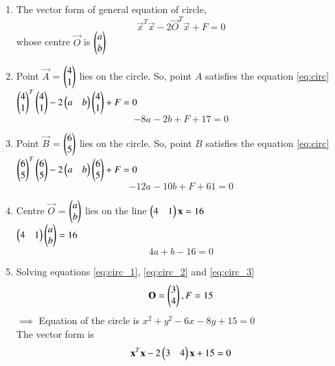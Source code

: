 \renewcommand{\theequation}{\theenumi}
\begin{enumerate}[label=\arabic*.,ref=\thesubsection.\theenumi]
\item The vector form of general equation of circle, 
\begin{equation} \label{eq:circ}
\vec{x}^T\vec{x}-2\vec{O}^T\vec{x}+F=0
\end{equation}
whose centre $\vec{O}$ is $\begin{pmatrix}a\\b\end{pmatrix}$

\item Point $\vec{A}$ = $\begin{pmatrix}4\\1\end{pmatrix}$ lies on the circle. So, point $A$ satisfies the equation \ref{eq:circ} \\
$\begin{pmatrix}4\\1\end{pmatrix}^T\begin{pmatrix}4\\1\end{pmatrix}-2\begin{pmatrix}a&b\end{pmatrix}\begin{pmatrix}4\\1\end{pmatrix}+F=0$ \\
\begin{equation} \label{eq:circ_1}
-8a-2b+F+17=0
\end{equation}

\item Point $\vec{B}$ = $\begin{pmatrix}6\\5\end{pmatrix}$ lies on the circle. So, point $B$ satisfies the equation \ref{eq:circ} \\
$\begin{pmatrix}6\\5\end{pmatrix}^T\begin{pmatrix}6\\5\end{pmatrix}-2\begin{pmatrix}a&b\end{pmatrix}\begin{pmatrix}6\\5\end{pmatrix}+F=0$ \\
\begin{equation} \label{eq:circ_2}
-12a-10b+F+61=0
\end{equation}

\item  Centre $\vec{O}$ = $\begin{pmatrix}a\\b\end{pmatrix}$ lies on the line $\begin{pmatrix}4&1\end{pmatrix}\mathbf{x}=16$ \\
$\begin{pmatrix}4&1\end{pmatrix}\begin{pmatrix}a\\b\end{pmatrix}=16$ \\
\begin{equation} \label{eq:circ_3}
4a+b-16=0
\end{equation}

\item Solving equations \ref{eq:circ_1}, \ref{eq:circ_2} and \ref{eq:circ_3} \\
$$ \mathbf{O} = \begin{pmatrix}3\\4\end{pmatrix}, F = 15$$
$\implies$ Equation of the circle is $x^2+y^2-6x-8y+15=0$ \\ 
The vector form is 
$$\mathbf{x}^T\mathbf{x}-2\begin{pmatrix}3&4\end{pmatrix}\mathbf{x}+15=0$$


\end{enumerate}
